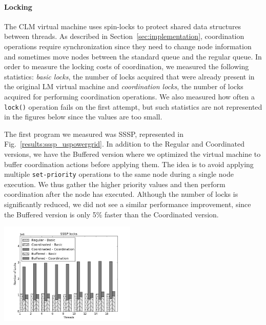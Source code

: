 \paragraph{Locking} The CLM virtual machine uses spin-locks to protect shared data structures between
threads. As described in Section~\ref{sec:implementation}, coordination
operations require synchronization since they need to change node information
and sometimes move nodes between the standard queue and the regular queue.
In order to measure the locking costs of coordination, we measured the following
statistics: \emph{basic locks}, the number of locks acquired that were already
present in the original LM virtual machine and \emph{coordination locks}, the
number of locks acquired for performing coordination operations. We also
measured how often a \texttt{lock()} operation fails on the first attempt, but
such statistics are not represented in the figures below since the values are
too small.

The first program we measured was SSSP, represented in
Fig.~\ref{results:sssp_uspowergrid}. In addition to the Regular and
Coordinated versions, we have the Buffered version where we
optimized the virtual machine to buffer coordination actions before applying
them. The idea is to avoid applying multiple \texttt{set-priority} operations to
the same node during a single node execution. We thus gather the higher priority
values and then perform coordination after the node has executed.
Although the number of locks is significantly reduced, we did not see a
similar performance improvement, since the Buffered version is only
5\% faster than the Coordinated version.

\begin{topfig}
   \begin{center}
      \includegraphics[width=6.5cm]{results/locks/sssp-locks.png}
   \end{center}
\end{topfig}

